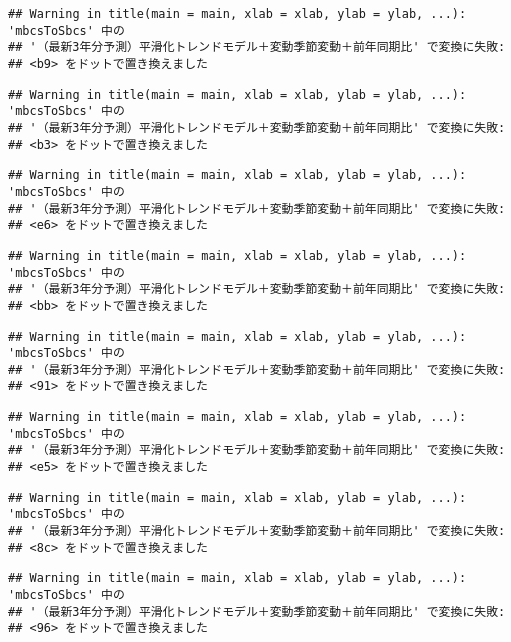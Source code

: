 \documentclass[]{article}
\begin{document}
\begin{verbatim}
## Warning in title(main = main, xlab = xlab, ylab = ylab, ...): 'mbcsToSbcs' 中の
## '（最新3年分予測）平滑化トレンドモデル＋変動季節変動＋前年同期比' で変換に失敗:
## <b9> をドットで置き換えました
\end{verbatim}

\begin{verbatim}
## Warning in title(main = main, xlab = xlab, ylab = ylab, ...): 'mbcsToSbcs' 中の
## '（最新3年分予測）平滑化トレンドモデル＋変動季節変動＋前年同期比' で変換に失敗:
## <b3> をドットで置き換えました
\end{verbatim}

\begin{verbatim}
## Warning in title(main = main, xlab = xlab, ylab = ylab, ...): 'mbcsToSbcs' 中の
## '（最新3年分予測）平滑化トレンドモデル＋変動季節変動＋前年同期比' で変換に失敗:
## <e6> をドットで置き換えました
\end{verbatim}

\begin{verbatim}
## Warning in title(main = main, xlab = xlab, ylab = ylab, ...): 'mbcsToSbcs' 中の
## '（最新3年分予測）平滑化トレンドモデル＋変動季節変動＋前年同期比' で変換に失敗:
## <bb> をドットで置き換えました
\end{verbatim}

\begin{verbatim}
## Warning in title(main = main, xlab = xlab, ylab = ylab, ...): 'mbcsToSbcs' 中の
## '（最新3年分予測）平滑化トレンドモデル＋変動季節変動＋前年同期比' で変換に失敗:
## <91> をドットで置き換えました
\end{verbatim}

\begin{verbatim}
## Warning in title(main = main, xlab = xlab, ylab = ylab, ...): 'mbcsToSbcs' 中の
## '（最新3年分予測）平滑化トレンドモデル＋変動季節変動＋前年同期比' で変換に失敗:
## <e5> をドットで置き換えました
\end{verbatim}

\begin{verbatim}
## Warning in title(main = main, xlab = xlab, ylab = ylab, ...): 'mbcsToSbcs' 中の
## '（最新3年分予測）平滑化トレンドモデル＋変動季節変動＋前年同期比' で変換に失敗:
## <8c> をドットで置き換えました
\end{verbatim}

\begin{verbatim}
## Warning in title(main = main, xlab = xlab, ylab = ylab, ...): 'mbcsToSbcs' 中の
## '（最新3年分予測）平滑化トレンドモデル＋変動季節変動＋前年同期比' で変換に失敗:
## <96> をドットで置き換えました
\end{verbatim}
\end{document}
